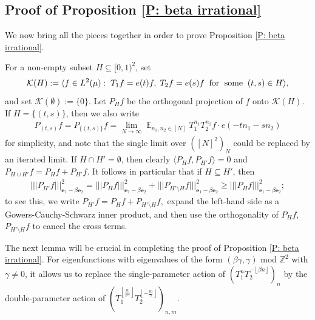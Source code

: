 \documentclass[11pt]{amsart}
\theoremstyle{definition}
\DeclareMathOperator*{\E}{\mathbb{E}}
\newcommand{\Z}{{\mathbb Z}}
\newcommand{\CK}{{\mathcal K}}
\newcommand{\be}{{\mathbf{e}}}
\newcommand{\nnorm}[1]{\lvert\!|\!| #1|\!|\!\rvert}
\newcommand{\1}{{\mathbf{1}}}
\newcommand{\floor}[1]{{\left \lfloor #1 \right \rfloor}}
\begin{document}
\subsection{Proof of Proposition \ref{P: beta irrational}}\label{SS: seminorm comparison base case}
We now bring all the pieces together in order to prove Proposition \ref{P: beta irrational}.

For a non-empty subset $H\subseteq[0,1)^2$, set
$$\CK(H) := \langle f\in L^2(\mu):\; T_1 f = e(t)f,\; T_2f = e(s)f\;\; \textrm{for\; some}\;\; (t,s)\in H\rangle,$$
and set $\CK(\emptyset):=\{0\}$. Let $P_H f$ be the orthogonal projection of $f$ onto $\CK(H)$. If $H=\{(t,s)\}$, then we also write
\begin{align*}
    P_{(t,s)}f =P_{\{(t,s)\}}f= \lim_{N\to\infty}\E_{n_1, n_2\in[N]}T_1^{n_1}T_2^{n_2}f\cdot e(-tn_1 - sn_2)
\end{align*}
for simplicity, and note that the single limit over $([N]^2)_N$ could be replaced by an iterated limit. If $H\cap H' = \emptyset$, then clearly $\langle P_H f, P_{H'} f\rangle = 0$ and $P_{H\cup H'} f = P_H f + P_{H'}f$.  It follows in particular that if $H\subseteq H'$, then
\begin{align}
    \nnorm{P_{H'} f}_{\be_1-\beta \be_2}^2 = \nnorm{P_{H} f}_{\be_1-\beta \be_2}^2 + \nnorm{P_{H'\setminus H} f}_{\be_1-\beta \be_2}^2\geq \nnorm{P_{H} f}_{\be_1-\beta \be_2}^2;
\end{align}
to see this, we write $P_{H'}f = P_H f +P_{H'\setminus H} f,$ expand the left-hand side as a Gowers-Cauchy-Schwarz inner product, and then use the orthogonality of $P_H f$, $P_{H'\setminus H} f$ to cancel the cross terms.

The next lemma will be crucial in completing the proof of Proposition \ref{P: beta irrational}. For eigenfunctions with eigenvalues of the form $(\beta \gamma, \gamma)$ mod $\Z^2$ with $\gamma\neq 0$, it allows us to replace the single-parameter action of $(T_1^n T_2^{-\floor{\beta n}})_n$ by the double-parameter action of $(T_1^{\floor{\frac{n}{\beta \gamma}}} T_2^{\floor{-\frac{m}{\gamma}}})_{n,m}$.
\end{document}

